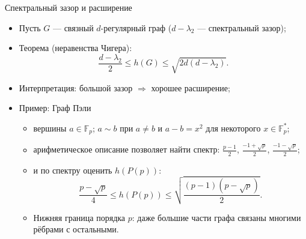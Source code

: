 \documentclass[serif, aspectratio=169]{beamer}
\begin{document}
\begin{frame}{Спектральный зазор и расширение}
    \begin{itemize}
        \item Пусть $G$ --- связный $d$-регулярный граф ($d-\lambda_2$ --- спектральный зазор);
        \item Теорема (неравенства Чигера):
        \[\frac{d-\lambda_2}{2}\le h(G)\le\sqrt{2d(d-\lambda_2)}.\]
        \item Интерпретация: большой зазор $\Rightarrow$ хорошее расширение;
        \item Пример: Граф Пэли 
        \begin{itemize}
            \item вершины $a\in\mathbb{F}_p$; $a\sim b$ при $a\ne b$ и $a-b=x^2$ для некоторого $x\in\mathbb{F}_p^*$;
            \item арифметическое описание позволяет найти спектр: $\frac{p-1}{2}$, $\frac{-1+\sqrt p}{2}$, $\frac{-1-\sqrt p}{2}$;
            \item и по спектру оценить $h(P(p))$:
            \[
                \frac{p-\sqrt p}{4}\le h(P(p))\le
                \sqrt{\frac{(p-1)(p-\sqrt p)}{2}}.
            \]
            \item Нижняя граница порядка $p$: даже большие части графа связаны многими рёбрами с остальными.
        \end{itemize}
        
    \end{itemize}

    \note{
        \begin{itemize}
            \item ---
        \end{itemize}
    }
\end{frame}
\end{document}
